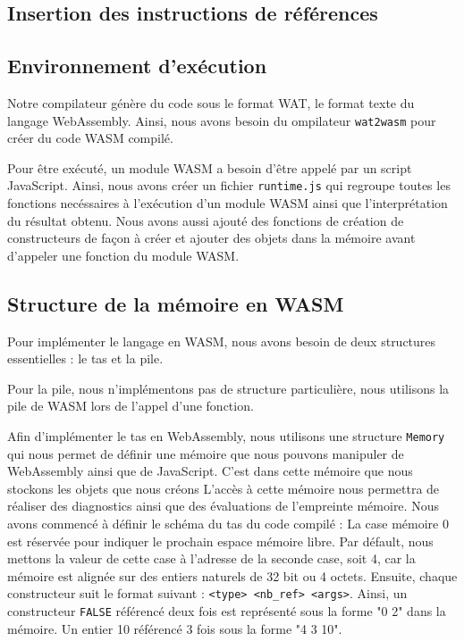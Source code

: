 \documentclass{rapportECL}
\begin{document}
\subsection{Insertion des instructions de références}


\subsection{Environnement d'exécution}

Notre compilateur génère du code sous le format WAT, le format texte du langage WebAssembly. Ainsi, nous avons besoin
du ompilateur \verb|wat2wasm| pour créer du code WASM compilé.

Pour être exécuté, un module WASM a besoin d'être appelé par un script JavaScript. Ainsi, nous avons créer un fichier 
\verb|runtime.js| qui regroupe toutes les fonctions necéssaires à l'exécution d'un module WASM ainsi que l'interprétation
du résultat obtenu. Nous avons aussi ajouté des fonctions de création de constructeurs de façon à créer et ajouter des objets 
dans la mémoire avant d'appeler une fonction du module WASM.

\subsection{Structure de la mémoire en WASM}

Pour implémenter le langage en WASM, nous avons besoin de deux structures essentielles : le tas et la pile.

\medskip

Pour la pile, nous n'implémentons pas de structure particulière, nous utilisons la pile de WASM lors de l'appel d'une fonction.

\medskip

Afin d'implémenter le tas en WebAssembly, nous utilisons une structure \verb|Memory| qui nous permet de définir une mémoire que 
nous pouvons manipuler de WebAssembly ainsi que de JavaScript.
C'est dans cette mémoire que nous stockons les objets que nous créons
L'accès à cette mémoire nous permettra de réaliser des diagnostics ainsi que des évaluations de l'empreinte mémoire.
Nous avons commencé à définir le schéma du tas du code compilé :
La case mémoire 0 est réservée pour indiquer le prochain espace mémoire libre. Par défault, nous mettons la valeur de cette case à 
l'adresse de la seconde case, soit 4, car la mémoire est alignée sur des entiers naturels de 32 bit ou 4 octets.
Ensuite, chaque constructeur suit le format suivant : \verb|<type> <nb_ref> <args>|. Ainsi, un constructeur \verb|FALSE| référencé 
deux fois est représenté sous la forme "0 2" dans la mémoire. Un entier 10 référencé 3 fois sous la forme "4 3 10".
\end{document}
